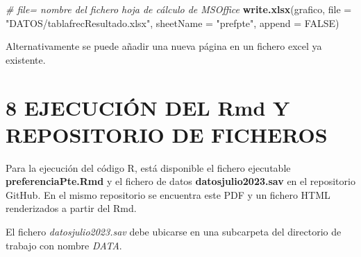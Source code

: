 \documentclass[
  12 pt,
  a4paper,
]{article}
\newenvironment{Shaded}{\begin{snugshade}}{\end{snugshade}}
\newcommand{\AttributeTok}[1]{\textcolor[rgb]{0.13,0.29,0.53}{#1}}
\newcommand{\CommentTok}[1]{\textcolor[rgb]{0.56,0.35,0.01}{\textit{#1}}}
\newcommand{\ConstantTok}[1]{\textcolor[rgb]{0.56,0.35,0.01}{#1}}
\newcommand{\FunctionTok}[1]{\textcolor[rgb]{0.13,0.29,0.53}{\textbf{#1}}}
\newcommand{\NormalTok}[1]{#1}
\newcommand{\StringTok}[1]{\textcolor[rgb]{0.31,0.60,0.02}{#1}}
\begin{document}
\begin{Shaded}
\begin{Highlighting}[]
\CommentTok{\# file= nombre del fichero hoja de cálculo de MSOffice}
\FunctionTok{write.xlsx}\NormalTok{(grafico, }\AttributeTok{file =} \StringTok{"DATOS/tablafrecResultado.xlsx"}\NormalTok{,}
           \AttributeTok{sheetName =} \StringTok{"prefpte"}\NormalTok{, }\AttributeTok{append =} \ConstantTok{FALSE}\NormalTok{)           }
\end{Highlighting}
\end{Shaded}

Alternativamente se puede añadir una nueva página en un fichero excel ya
existente.

\newpage

\hypertarget{id-github}{%
\section{8 EJECUCIÓN DEL Rmd Y REPOSITORIO DE
FICHEROS}\label{id-github}}

Para la ejecución del código R, está disponible el fichero ejecutable
\textbf{preferenciaPte.Rmd} y el fichero de datos
\textbf{datosjulio2023.sav} en el repositorio GitHub. En el mismo
repositorio se encuentra este PDF y un fichero HTML renderizados a
partir del Rmd.

El fichero \emph{datosjulio2023.sav} debe ubicarse en una subcarpeta del
directorio de trabajo con nombre \emph{DATA}.
\end{document}
